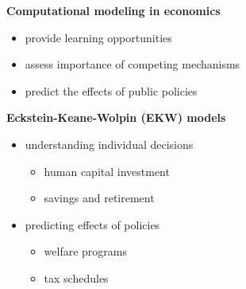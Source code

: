 \begin{frame}\textbf{Computational modeling in economics}\vspace{0.3cm}

\begin{itemize}\setlength\itemsep{1em}
\item provide learning opportunities
\item assess importance of competing mechanisms
\item predict the effects of public policies
\end{itemize}

\end{frame}
  \begin{frame}\textbf{Eckstein-Keane-Wolpin (EKW) models}\vspace{0.3cm}

  \begin{itemize}\setlength\itemsep{1em}
  	\item understanding individual decisions\medskip
  	\begin{itemize}\setlength\itemsep{1em}
  		\item human capital investment
  		\item savings and retirement
  	\end{itemize}
  	\item predicting effects of policies\medskip
  	\begin{itemize}\setlength\itemsep{1em}
  		\item welfare programs
  		\item tax schedules
  	\end{itemize}

  \end{itemize}
  \end{frame}

